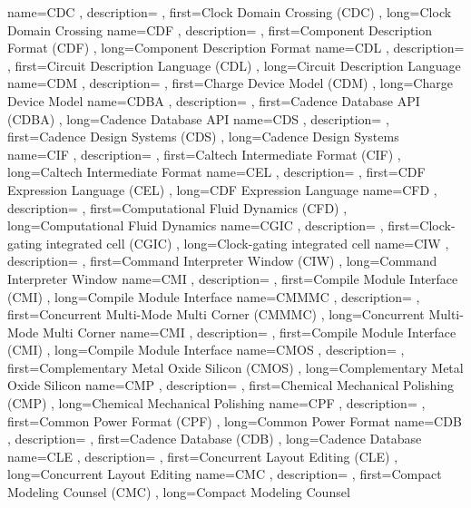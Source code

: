 { name={CDC}
, description={}
, first={Clock Domain Crossing (CDC)}
, long={Clock Domain Crossing}
}
{ name={CDF}
, description={}
, first={Component Description Format (CDF)}
, long={Component Description Format}
}
{ name={CDL}
, description={}
, first={Circuit Description Language (CDL)}
, long={Circuit Description Language}
}
{ name={CDM}
, description={}
, first={Charge Device Model (CDM)}
, long={Charge Device Model}
}
{ name={CDBA}
, description={}
, first={Cadence Database API (CDBA)}
, long={Cadence Database API}
}
{ name={CDS}
, description={}
, first={Cadence Design Systems (CDS)}
, long={Cadence Design Systems}
}
{ name={CIF}
, description={}
, first={Caltech Intermediate Format (CIF)}
, long={Caltech Intermediate Format}
}
{ name={CEL}
, description={}
, first={CDF Expression Language (CEL)}
, long={CDF Expression Language}
}
{ name={CFD}
, description={}
, first={Computational Fluid Dynamics (CFD)}
, long={Computational Fluid Dynamics}
}
{ name={CGIC}
, description={}
, first={Clock-gating integrated cell (CGIC)}
, long={Clock-gating integrated cell}
}
{ name={CIW}
, description={}
, first={Command Interpreter Window (CIW)}
, long={Command Interpreter Window}
}
{ name={CMI}
, description={}
, first={Compile Module Interface (CMI)}
, long={Compile Module Interface}
}
{ name={CMMMC}
, description={}
, first={Concurrent Multi-Mode Multi Corner (CMMMC)}
, long={Concurrent Multi-Mode Multi Corner}
}
{ name={CMI}
, description={}
, first={Compile Module Interface (CMI)}
, long={Compile Module Interface}
}
{ name={CMOS}
, description={}
, first={Complementary Metal Oxide Silicon (CMOS)}
, long={Complementary Metal Oxide Silicon}
}
{ name={CMP}
, description={}
, first={Chemical Mechanical Polishing (CMP)}
, long={Chemical Mechanical Polishing}
}
{ name={CPF}
, description={}
, first={Common Power Format (CPF)}
, long={Common Power Format}
}
{ name={CDB}
, description={}
, first={Cadence Database (CDB)}
, long={Cadence Database}
}
{ name={CLE}
, description={}
, first={Concurrent Layout Editing (CLE)}
, long={Concurrent Layout Editing}
}
{ name={CMC}
, description={}
, first={Compact Modeling Counsel (CMC)}
, long={Compact Modeling Counsel}
}
